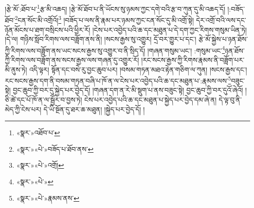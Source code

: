 །རྩེ་མོ་:ཐོབ་པ་\footnote{«སྣར་»འཐོབ་པ་}རྩ་མི་འཆད། །རྩེ་མོ་ཐོབ་པ་ནི་ཡོངས་སུ་ཉམས་ཀྱང་དགེ་བའི་རྩ་བ་ཀུན་དུ་མི་འཆད་དོ། །:བཟོད་ཐོབ་\footnote{«སྣར་»«པེ་»བཟོད་པ་ཐོབ་ནས་}ངན་སོང་མི་འགྲོའོ།\footnote{«སྣར་»«པེ་»འགྲོ།} །བཟོད་པ་ལས་ནི་རྣམ་པར་ཉམས་ཀྱང་ངན་སོང་དུ་མི་འགྲོ་སྟེ། དེར་འགྲོ་བའི་ལས་དང་ཉོན་མོངས་པ་ཐག་བསྲིངས་པའི་ཕྱིར་རོ། །ངེས་པར་འབྱེད་པའི་ཆ་དང་མཐུན་པ་དེ་དག་ཀྱང་རིགས་གསུམ་ཡིན་ཏེ། །དེ་ལ། གཉིས་སློབ་རིགས་ལས་བཟློག་ནས་ནི། །སངས་རྒྱས་སུ་འགྱུར། དྲོ་བར་གྱུར་པ་དང་། རྩེ་མོ་སྐྱེས་པ་ཉན་ཐོས་ཀྱི་རིགས་ལས་བཟློག་ནས་ཡང་སངས་རྒྱས་སུ་འགྱུར་བ་ནི་སྲིད་དོ། །གཞན་གསུམ་ཡང་། :གསུམ་ཡང་\footnote{«སྣར་»«པེ་»}ཉན་ཐོས་ཀྱི་རིགས་ལས་བཟློག་ནས་སངས་རྒྱས་ལས་གཞན་དུ་འགྱུར་རོ། །རང་སངས་རྒྱས་ཀྱི་རིགས་རྣམས་ནི་བཟློག་པར་མི་ནུས་ཏེ། འདི་ལྟར། སྟོན་དང་བསེ་རུ་བྱང་ཆུབ་པར། །བསམ་གཏན་མཐའ་རྟེན་གཅིག་ལ་ཀུན། །སངས་རྒྱས་དང་། རང་སངས་རྒྱས་དག་ནི་བསམ་གཏན་བཞི་པ་ཁོ་ན་ལ་ངེས་པར་འབྱེད་པའི་ཆ་དང་མཐུན་པ་:རྣམས་ལས་\footnote{«སྣར་»«པེ་»རྣམས་ནས་}བཟུང་སྟེ། བྱང་ཆུབ་ཀྱི་བར་དུ་སྐྱེད་པར་བྱེད་དོ། །གཞན་དག་ན་རེ་མི་སྡུག་པ་ནས་བཟུང་སྟེ། བྱང་ཆུབ་ཀྱི་བར་དུའོ་ཞེའོ། །ཅི་ཚེ་དང་པོ་ཁོ་ན་ལ་སྦྱོར་བ་བྱས་ཏེ། ངེས་པར་འབྱེད་པའི་ཆ་དང་མཐུན་པ་སྐྱེད་པར་བྱེད་དམ་ཞེ་ན། དེ་ལྟ་བུ་ནི་མེད་ཀྱི་ངེས་པར། དེ་ཡི་སྔོན་དུ་ཐར་ཆ་མཐུན། །སྐྱེད་པར་བྱེད་དོ། །
